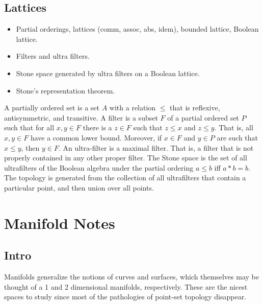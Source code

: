     \subsection{Lattices}
        \begin{itemize}
            \item Partial orderings, lattices (comm, assoc, abs, idem), bounded
                  lattice, Boolean lattice.
            \item Filters and ultra filters.
            \item Stone space generated by ultra filters on a Boolean lattice.
            \item Stone's representation theorem.
        \end{itemize}
        A partially ordered set is a set $A$ with a relation $\leq$ that is
        reflexive, antisymmetric, and transitive. A filter is a subset $F$ of a
        partial ordered set $P$ such that for all $x,y\in{F}$ there is a
        $z\in{F}$ such that $z\leq{x}$ and $z\leq{y}$. That is, all $x,y\in{F}$
        have a common lower bound. Moreover, if $x\in{F}$ and $y\in{P}$ are such
        that $x\leq{y}$, then $y\in{F}$. An ultra-filter is a maximal filter.
        That is, a filter that is not properly contained in any other proper
        filter. The Stone space is the set of all ultrafilters of the Boolean
        algebra under the partial ordering $a\leq{b}$ iff $a*b=b$. The topology
        is generated from the collection of all ultrafilters that contain a
        particular point, and then union over all points.
\section{Manifold Notes}
    \subsection{Intro}
        Manifolds generalize the notions of curves and surfaces, which themselves
        may be thought of a 1 and 2 dimensional manifolds, respectively. These are
        the nicest spaces to study since most of the pathologies of point-set
        topology disappear.